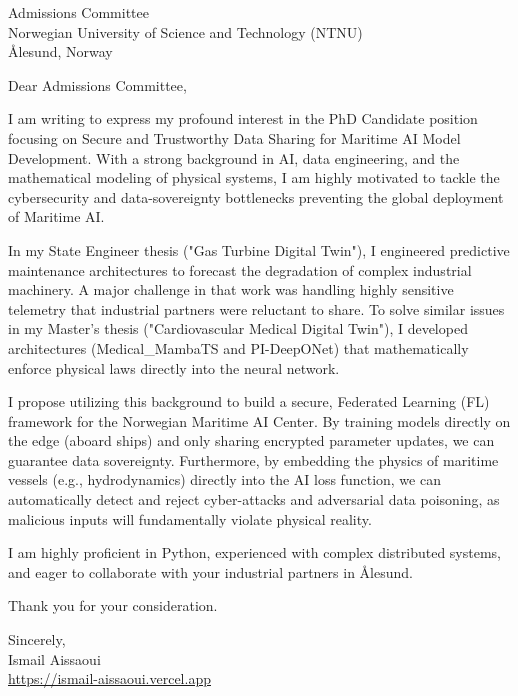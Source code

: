\documentclass[11pt, a4paper]{letter}
\begin{document}
\begin{letter}{Admissions Committee \\ Norwegian University of Science and Technology (NTNU) \\ Ålesund, Norway}
\opening{Dear Admissions Committee,}

I am writing to express my profound interest in the PhD Candidate position focusing on Secure and Trustworthy Data Sharing for Maritime AI Model Development. With a strong background in AI, data engineering, and the mathematical modeling of physical systems, I am highly motivated to tackle the cybersecurity and data-sovereignty bottlenecks preventing the global deployment of Maritime AI.

In my State Engineer thesis ("Gas Turbine Digital Twin"), I engineered predictive maintenance architectures to forecast the degradation of complex industrial machinery. A major challenge in that work was handling highly sensitive telemetry that industrial partners were reluctant to share. To solve similar issues in my Master's thesis ("Cardiovascular Medical Digital Twin"), I developed architectures (Medical\_MambaTS and PI-DeepONet) that mathematically enforce physical laws directly into the neural network.

I propose utilizing this background to build a secure, Federated Learning (FL) framework for the Norwegian Maritime AI Center. By training models directly on the edge (aboard ships) and only sharing encrypted parameter updates, we can guarantee data sovereignty. Furthermore, by embedding the physics of maritime vessels (e.g., hydrodynamics) directly into the AI loss function, we can automatically detect and reject cyber-attacks and adversarial data poisoning, as malicious inputs will fundamentally violate physical reality.

I am highly proficient in Python, experienced with complex distributed systems, and eager to collaborate with your industrial partners in Ålesund.

Thank you for your consideration.

\closing{Sincerely, \\ Ismail Aissaoui \\ \href{https://ismail-aissaoui.vercel.app}{https://ismail-aissaoui.vercel.app}}
\end{letter}
\end{document}
